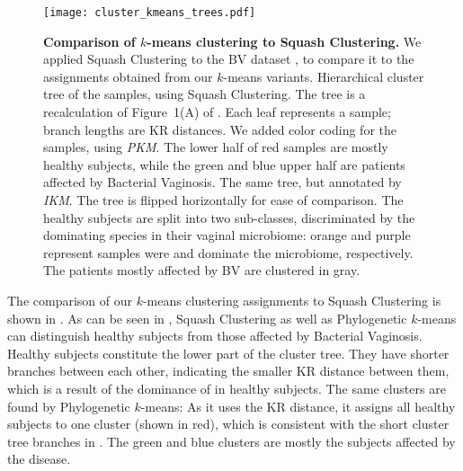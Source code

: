 \begin{figure}[p]
    \centering
    \texttt{[image: cluster\_kmeans\_trees.pdf]}
    \begin{subfigure}{0pt}
        \label{fig:cluster_kmeans_trees:sub:mass_tree}
    \end{subfigure}
    \begin{subfigure}{0pt}
        \label{fig:cluster_kmeans_trees:sub:imbalance_tree}
    \end{subfigure}
    \caption[Comparison of $k$-means clustering to Squash Clustering]{
        \textbf{Comparison of $k$-means clustering to Squash Clustering.}
        We applied Squash Clustering to the \ac{BV} dataset \cite{Srinivasan2012},
        to compare it to the assignments obtained from our $k$-means variants.
        Hierarchical cluster tree of the samples, using Squash Clustering.
        The tree is a recalculation of Figure~1(A) of \cite{Srinivasan2012}.
        Each leaf represents a sample; branch lengths are KR distances.
        We added color coding for the samples, using \emph{PKM}.
        The lower half of red samples are mostly healthy subjects,
        while the green and blue upper half are patients affected by Bacterial Vaginosis.
        The same tree, but annotated by \emph{IKM}.
        The tree is flipped horizontally for ease of comparison.
        The healthy subjects are split into two sub-classes,
        discriminated by the dominating species in their vaginal microbiome:
        orange and purple represent samples were  and 
        dominate the microbiome, respectively.
        The patients mostly affected by BV are clustered in gray.
    }
    \label{fig:cluster_kmeans_trees}
\end{figure}

The comparison of our $k$-means clustering assignments to Squash Clustering is shown in .
As can be seen in , Squash Clustering as well as
Phylogenetic $k$-means can distinguish healthy subjects from those affected by Bacterial Vaginosis.
Healthy subjects constitute the lower part of the cluster tree.
They have shorter branches between each other, indicating the smaller KR distance between them,
which is a result of the dominance of  in healthy subjects.
The same clusters are found by Phylogenetic $k$-means:
As it uses the KR distance, it assigns all healthy subjects to one cluster (shown in red),
which is consistent with the short cluster tree branches in .
The green and blue clusters are mostly the subjects affected by the disease.


